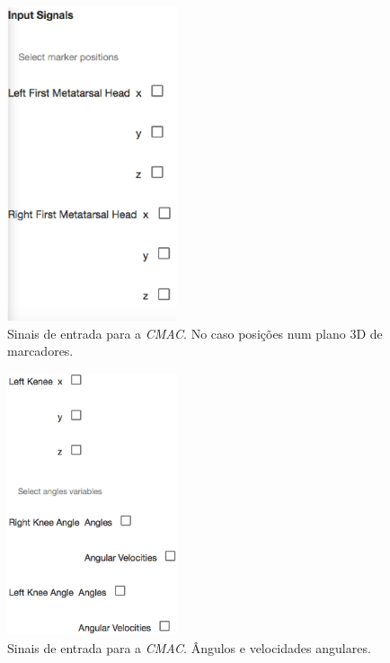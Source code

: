 \begin{figure}[ht]
	\centering
	\includegraphics[width=5cm]{figuras/tela29.eps}
	\caption{Sinais de entrada para a \emph{CMAC}. No caso posições num plano 3D de marcadores.}
\label{tela29}
\end{figure}

\begin{figure}[ht]
	\centering
	\includegraphics[width=5cm]{figuras/tela30.eps}
	\caption{Sinais de entrada para a \emph{CMAC}. Ângulos e velocidades angulares.}
\label{tela30}
\end{figure}


